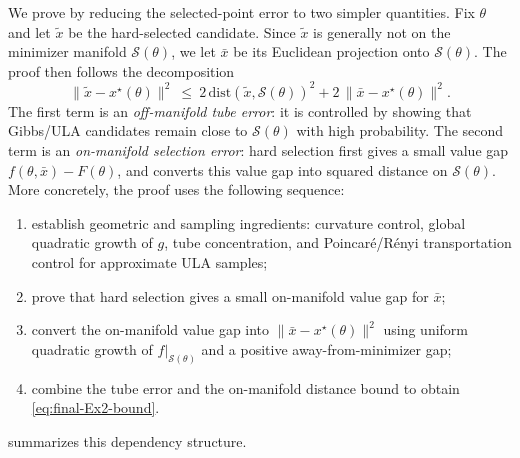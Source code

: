 \documentclass{article}
\theoremstyle{normaltheorem}
\newcommand{\calS}{\mathcal{S}}
\begin{document}
We prove  by reducing the selected-point error to two simpler quantities.
Fix \(\theta\) and let \(\tilde x\) be the hard-selected candidate. Since \(\tilde x\) is generally not on the minimizer
manifold \(\calS(\theta)\), we let \(\bar x\) be its Euclidean projection onto \(\calS(\theta)\). The proof then follows the
decomposition
\[
\|\tilde x-x^\star(\theta)\|^2
\ \le\
2\,\mathrm{dist}(\tilde x,\calS(\theta))^2
+2\,\|\bar x-x^\star(\theta)\|^2 .
\]
	The first term is an \emph{off-manifold tube error}: it is controlled by showing that Gibbs/ULA candidates remain close to
	\(\calS(\theta)\) with high probability. The second term is an \emph{on-manifold selection error}: hard selection first gives
	a small value gap \(f(\theta,\bar x)-F(\theta)\), and \Cref{prop:uniform-riem-nondeg} converts this value gap
	into squared distance on \(\calS(\theta)\). More concretely, the proof uses the following sequence:
\begin{enumerate}[leftmargin=*]
\item establish geometric and sampling ingredients: curvature control, global quadratic growth of \(g\), tube concentration,
and Poincar\'e/R\'enyi transportation control for approximate ULA samples;
\item prove that hard selection gives a small on-manifold value gap for \(\bar x\);
\item convert the on-manifold value gap into \(\|\bar x-x^\star(\theta)\|^2\) using uniform quadratic growth of
\(f|_{\calS(\theta)}\) and a positive away-from-minimizer gap;
\item combine the tube error and the on-manifold distance bound to obtain \eqref{eq:final-Ex2-bound}.
\end{enumerate}
 summarizes this dependency structure.
\end{document}
